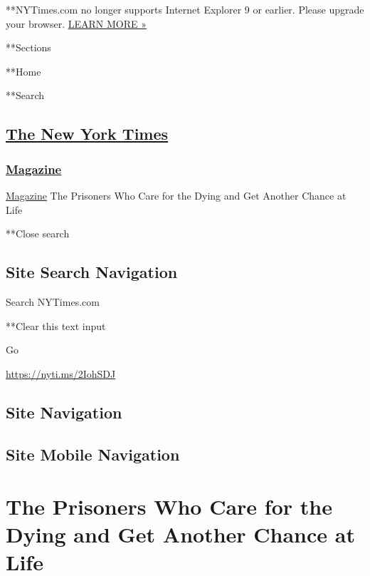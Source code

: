  **NYTimes.com no longer supports Internet Explorer 9 or earlier. Please
upgrade your browser.
\href{http://www.nytimes3xbfgragh.onion/content/help/site/ie9-support.html}{LEARN
MORE »}

**Sections

**Home

**Search

\hypertarget{the-new-york-times}{%
\subsection{\texorpdfstring{\href{http://www.nytimes3xbfgragh.onion/}{The
New York Times}}{The New York Times}}\label{the-new-york-times}}

\hypertarget{-magazine-}{%
\subsubsection{\texorpdfstring{
\href{https://www.nytimes3xbfgragh.onion/section/magazine}{Magazine}
}{ Magazine }}\label{-magazine-}}

 \href{https://www.nytimes3xbfgragh.onion/section/magazine}{Magazine}
\textbar{}The Prisoners Who Care for the Dying and Get Another Chance at
Life

**Close search

\hypertarget{site-search-navigation}{%
\subsection{Site Search Navigation}\label{site-search-navigation}}

Search NYTimes.com

**Clear this text input

Go

\url{https://nyti.ms/2IohSDJ}

\hypertarget{site-navigation}{%
\subsection{Site Navigation}\label{site-navigation}}

\hypertarget{site-mobile-navigation}{%
\subsection{Site Mobile Navigation}\label{site-mobile-navigation}}

\hypertarget{the-prisoners-who-care-for-the-dying-and-get-another-chance-at-life}{%
\section{The Prisoners Who Care for the Dying and Get Another Chance at
Life}\label{the-prisoners-who-care-for-the-dying-and-get-another-chance-at-life}}

